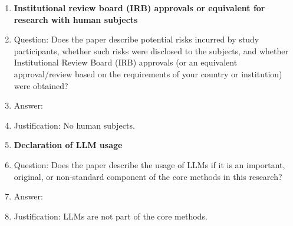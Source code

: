 \begin{enumerate}
\item {\bf Institutional review board (IRB) approvals or equivalent for research with human subjects}
    \item[] Question: Does the paper describe potential risks incurred by study participants, whether such risks were disclosed to the subjects, and whether Institutional Review Board (IRB) approvals (or an equivalent approval/review based on the requirements of your country or institution) were obtained?
    \item[] Answer: \answerNA{}
    \item[] Justification: No human subjects.

\item {\bf Declaration of LLM usage}
    \item[] Question: Does the paper describe the usage of LLMs if it is an important, original, or non-standard component of the core methods in this research?
    \item[] Answer: \answerNA{}
    \item[] Justification: LLMs are not part of the core methods.

\end{enumerate}
